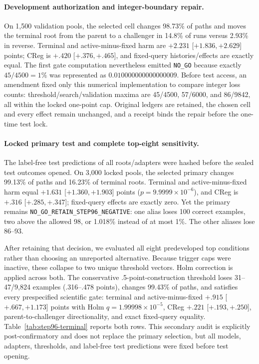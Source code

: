 \paragraph{Development authorization and integer-boundary repair.}
On 1,500 validation pools, the selected cell changes 98.73\% of paths and moves the terminal root from the parent to a challenger in 14.8\% of runs versus 2.93\% in reverse. Terminal and active-minus-fixed harm are $+2.231$ [$+1.836,+2.629$] points; CReg is $+.420$ [$+.376,+.465$], and fixed-query histories/effects are exactly equal. The first gate computation nevertheless emitted \texttt{NO\_GO} because exactly $45/4500=1\%$ was represented as $0.010000000000000009$. Before test access, an amendment fixed only this numerical implementation to compare integer loss counts: threshold/search/validation maxima are 45/4500, 57/6000, and 86/9842, all within the locked one-point cap. Original ledgers are retained, the chosen cell and every effect remain unchanged, and a receipt binds the repair before the one-time test lock.

\paragraph{Locked primary test and complete top-eight sensitivity.}
The label-free test predictions of all roots/adapters were hashed before the sealed test outcomes opened. On 3,000 locked pools, the selected primary changes 99.13\% of paths and 16.23\% of terminal roots. Terminal and active-minus-fixed harm equal $+1.631$ [$+1.360,+1.903$] points ($p=9.9999\times10^{-6}$), and CReg is $+.316$ [$+.285,+.347$]; fixed-query effects are exactly zero. Yet the primary remains \texttt{NO\_GO\_RETAIN\_STEP96\_NEGATIVE}: one alias loses 100 correct examples, two above the allowed 98, or 1.018\% instead of at most 1\%. The other aliases lose 86--93.

After retaining that decision, we evaluated all eight predeveloped top conditions rather than choosing an unreported alternative. Because trigger caps were inactive, these collapse to two unique threshold vectors. Holm correction is applied across both. The conservative .5-point-construction threshold loses 31--47/9,824 examples (.316--.478 points), changes 99.43\% of paths, and satisfies every prespecified scientific gate: terminal and active-minus-fixed $+.915$ [$+.667,+1.173$] points with Holm $q=1.99998\times10^{-5}$, CReg $+.221$ [$+.193,+.250$], parent-to-challenger directionality, and exact fixed-query equality. Table~\ref{tab:step96-terminal} reports both rows. This secondary audit is explicitly post-confirmatory and does not replace the primary selection, but all models, adapters, thresholds, and label-free test predictions were fixed before test opening.

